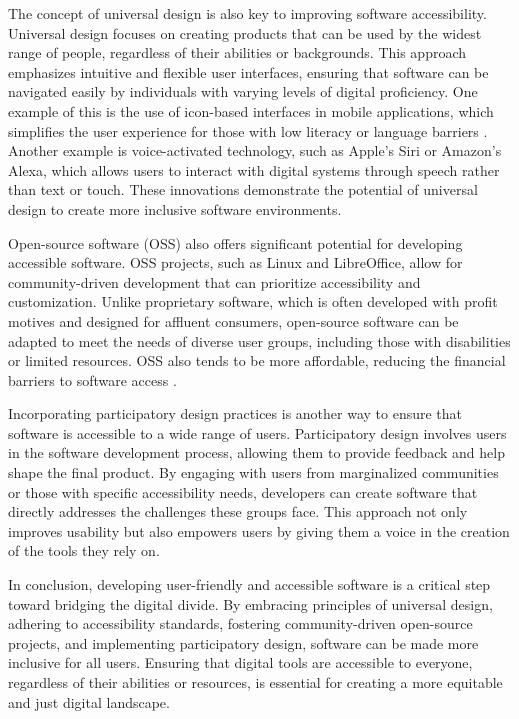\begin{refsection}
The concept of universal design is also key to improving software accessibility. Universal design focuses on creating products that can be used by the widest range of people, regardless of their abilities or backgrounds. This approach emphasizes intuitive and flexible user interfaces, ensuring that software can be navigated easily by individuals with varying levels of digital proficiency. One example of this is the use of icon-based interfaces in mobile applications, which simplifies the user experience for those with low literacy or language barriers \cite[pp.~79-82]{stallman2010freesoftware}. Another example is voice-activated technology, such as Apple's Siri or Amazon's Alexa, which allows users to interact with digital systems through speech rather than text or touch. These innovations demonstrate the potential of universal design to create more inclusive software environments.

Open-source software (OSS) also offers significant potential for developing accessible software. OSS projects, such as Linux and LibreOffice, allow for community-driven development that can prioritize accessibility and customization. Unlike proprietary software, which is often developed with profit motives and designed for affluent consumers, open-source software can be adapted to meet the needs of diverse user groups, including those with disabilities or limited resources. OSS also tends to be more affordable, reducing the financial barriers to software access \cite[pp.~20-23]{fuchs2016communication}.

Incorporating participatory design practices is another way to ensure that software is accessible to a wide range of users. Participatory design involves users in the software development process, allowing them to provide feedback and help shape the final product. By engaging with users from marginalized communities or those with specific accessibility needs, developers can create software that directly addresses the challenges these groups face. This approach not only improves usability but also empowers users by giving them a voice in the creation of the tools they rely on.

In conclusion, developing user-friendly and accessible software is a critical step toward bridging the digital divide. By embracing principles of universal design, adhering to accessibility standards, fostering community-driven open-source projects, and implementing participatory design, software can be made more inclusive for all users. Ensuring that digital tools are accessible to everyone, regardless of their abilities or resources, is essential for creating a more equitable and just digital landscape.


\end{refsection}
